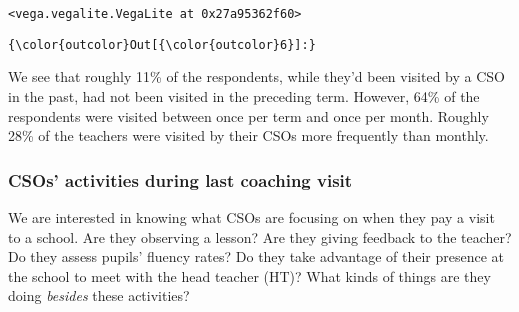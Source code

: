 \documentclass[11pt]{article}
\begin{document}
    
    \begin{verbatim}
<vega.vegalite.VegaLite at 0x27a95362f60>
    \end{verbatim}

    
\begin{Verbatim}[commandchars=\\\{\}]
{\color{outcolor}Out[{\color{outcolor}6}]:} 
\end{Verbatim}
            
    We see that roughly 11\% of the respondents, while they'd been visited
by a CSO in the past, had not been visited in the preceding term.
However, 64\% of the respondents were visited between once per term and
once per month. Roughly 28\% of the teachers were visited by their CSOs
more frequently than monthly.

    \hypertarget{csos-activities-during-last-coaching-visit}{%
\subsubsection{CSOs' activities during last coaching
visit}\label{csos-activities-during-last-coaching-visit}}

We are interested in knowing what CSOs are focusing on when they pay a
visit to a school. Are they observing a lesson? Are they giving feedback
to the teacher? Do they assess pupils' fluency rates? Do they take
advantage of their presence at the school to meet with the head teacher
(HT)? What kinds of things are they doing \emph{besides} these
activities?
\end{document}
